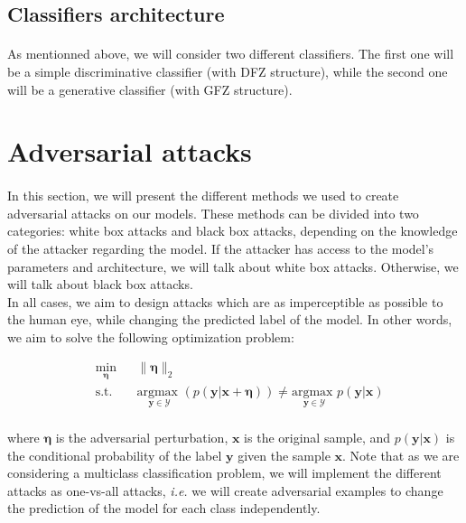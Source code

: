 \documentclass[11pt,twocolumn,letterpaper]{article}
\begin{document}
\subsection{Classifiers architecture}

\paragraph{} As mentionned above, we will consider two different classifiers. The first one will be a simple discriminative classifier (with DFZ structure), while the second one will be a generative classifier (with GFZ structure).

\section{Adversarial attacks}
\label{sec:attacks}

\paragraph{} In this section, we will present the different methods we used to create adversarial attacks on our models. These methods can be divided into two categories: white box attacks and black box attacks, depending on the knowledge of the attacker regarding the model. If the attacker has access to the model's parameters and architecture, we will talk about white box attacks. Otherwise, we will talk about black box attacks. \\
In all cases, we aim to design attacks which are as imperceptible as possible to the human eye, while changing the predicted label of the model. In other words, we aim to solve the following optimization problem:

\begin{equation*}
\begin{aligned}
& \underset{\bm{\eta}}{\text{min}}
& & \|\bm{\eta}\|_2 \\
& \text{s.t.} 
& & \underset{\bm{y} \in \mathcal{Y}}{\text{argmax }}(p(\bm{y}|\bm{x} + \bm{\eta})) \neq \underset{\bm{y} \in \mathcal{Y}}{\text{argmax }}p(\bm{y}|\bm{x}) \\
\end{aligned}
\end{equation*}

where $\bm{\eta}$ is the adversarial perturbation, $\bm{x}$ is the original sample, and $p(\bm{y}|\bm{x})$ is the conditional probability of the label $\bm{y}$ given the sample $\bm{x}$. Note that as we are considering a multiclass classification problem, we will implement the different attacks as one-vs-all attacks, \textit{i.e.} we will create adversarial examples to change the prediction of the model for each class independently.
\end{document}
